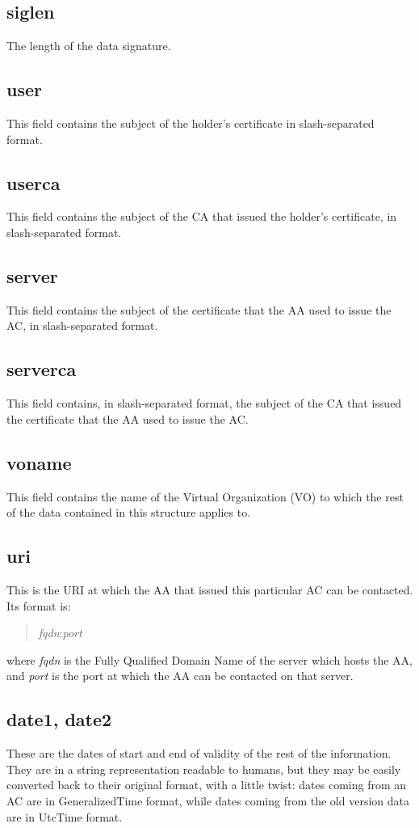 \documentclass[a4paper]{book}
\begin{document}
\subsection{siglen}
The length of the data signature.

\subsection{user}
This field contains the subject of the holder's certificate in
slash-separated format.

\subsection{userca}
This field contains the subject of the CA that issued the holder's
certificate, in slash-separated format.

\subsection{server}
This field contains the subject of the certificate that the AA used to
issue the AC, in slash-separated format.

\subsection{serverca}
This field contains, in slash-separated format, the subject of the CA that
issued the certificate that the AA used to issue the AC.

\subsection{voname}
This field contains the name of the Virtual Organization (VO) to which
the rest of the data contained in this structure applies to.

\subsection{uri}
This is the URI at which the AA that issued this particular AC can be
contacted. Its format is:
\begin{quote}
\emph{fqdn}:\emph{port}
\end{quote}
where \emph{fqdn} is the Fully Qualified Domain Name of the server
which hosts the AA, and \emph{port} is the port at which the AA can
be contacted on that server.

\subsection{date1, date2}
These are the dates of start and end of validity of the rest of the
information.  They are in a string representation readable to humans,
but they may be easily converted back to their original format, with a
little twist: dates coming from an AC are in GeneralizedTime format,
while dates coming from the old version data are in UtcTime format.
\end{document}
